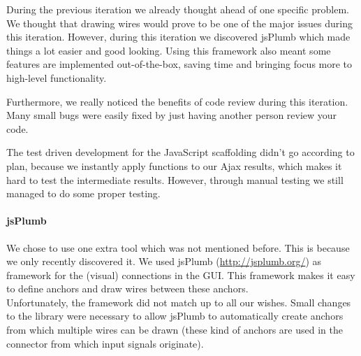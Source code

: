 \documentclass[a4paper]{article}
\begin{document}
During the previous iteration we already thought ahead of one specific problem. We thought that drawing wires would prove to be one of the major issues during this iteration. However, during this iteration we discovered jsPlumb which made things a lot easier and good looking. Using this framework also meant some features are implemented out-of-the-box, saving time and bringing focus  more to high-level functionality.

Furthermore, we really noticed the benefits of code review during this iteration. Many small bugs were easily fixed by just having another person review your code.

The test driven development for the JavaScript scaffolding didn't go according to plan, because we instantly apply functions to our Ajax results, which makes it hard to test the intermediate results. However, through manual testing we still managed to do some proper testing.


\label{jsPlumb}\paragraph{jsPlumb}
We chose to use one extra tool which was not mentioned before. This is because we only recently discovered it. We used jsPlumb (\url{http://jsplumb.org/}) as framework for the (visual) connections in the GUI. This framework makes it easy to define anchors and draw wires between these anchors. \\
Unfortunately, the framework did not match up to all our wishes. Small changes to the library were necessary to allow jsPlumb to automatically create anchors from which multiple wires can be drawn (these kind of anchors are used in the connector from which input signals originate).
\end{document}
